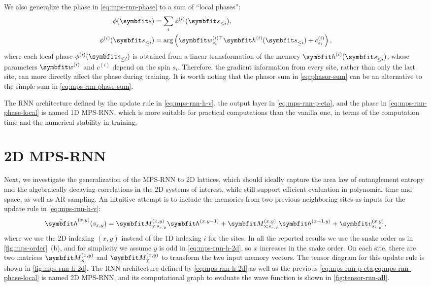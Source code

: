 We also generalize the phase in \cref{eq:mps-rnn-phase} to a sum of ``local phases'':
\begin{align}
\phi(\vs) &= \sum_i \phi^{(i)}(\vs_{\le i}), \label{eq:mps-rnn-phase-sum} \\
\phi^{(i)}(\vs_{\le i}) &= \arg\left( \vw^{(i) \transpose}_{s_i} \vh^{(i)}(\vs_{\le i}) + c^{(i)}_{s_i} \right), \label{eq:mps-rnn-phase-local}
\end{align}
where each local phase $\phi^{(i)}(\vs_{\le i})$ is obtained from a linear transformation of the memory $\vh^{(i)}(\vs_{\le i})$, whose parameters $\vw^{(i)}$ and $c^{(i)}$ depend on the spin $s_i$. Therefore, the gradient information from every site, rather than only the last site, can more directly affect the phase during training. It is worth noting that the phasor sum in \cref{eq:phasor-sum} can be an alternative to the simple sum in \cref{eq:mps-rnn-phase-sum}.

The RNN architecture defined by the update rule in \cref{eq:mps-rnn-h-v}, the output layer in \cref{eq:mps-rnn-p-eta}, and the phase in \cref{eq:mps-rnn-phase-local} is named 1D MPS-RNN, which is more suitable for practical computations than the vanilla one, in terms of the computation time and the numerical stability in training.

\section{2D MPS-RNN}
\label{sec:2d-mps-rnn}

Next, we investigate the generalization of the MPS-RNN to 2D lattices, which should ideally capture the area law of entanglement entropy and the algebraically decaying correlations in the 2D systems of interest, while still support efficient evaluation in polynomial time and space, as well as AR sampling. An intuitive attempt is to include the memories from two previous neighboring sites as inputs for the update rule in \cref{eq:mps-rnn-h-v}:
\begin{equation}
\tilde{\vh}^{(x, y)}(s_{x, y}) =
\mM^{(x, y)}_{\text{y}; s_{x, y}} \vh^{(x, y - 1)}
+ \mM^{(x, y)}_{\text{x}; s_{x, y}} \vh^{(x - 1, y)}
+ \vv^{(x, y)}_{s_{x, y}},
\label{eq:mps-rnn-h-2d}
\end{equation}
where we use the 2D indexing $(x, y)$ instead of the 1D indexing $i$ for the sites. In all the reported results we use the snake order as in \cref{fig:mps-order}~(b), and for simplicity we assume $y$ is odd in \cref{eq:mps-rnn-h-2d}, so $x$ increases in the snake order. On each site, there are two matrices $\mM^{(x, y)}_\text{x}$ and $\mM^{(x, y)}_\text{y}$ to transform the two input memory vectors. The tensor diagram for this update rule is shown in \cref{fig:mps-rnn-h-2d}. The RNN architecture defined by \cref{eq:mps-rnn-h-2d} as well as the previous \cref{eq:mps-rnn-p-eta,eq:mps-rnn-phase-local} is named 2D MPS-RNN, and its computational graph to evaluate the wave function is shown in \cref{fig:tensor-rnn-all}.

